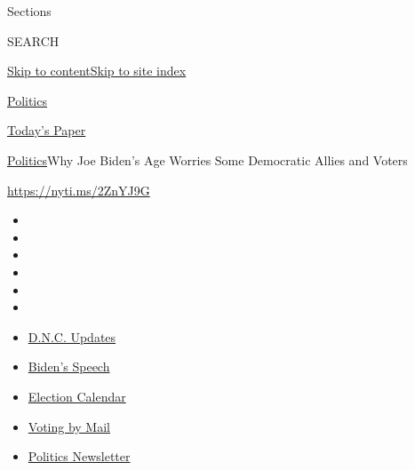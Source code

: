 Sections

SEARCH

\protect\hyperlink{site-content}{Skip to
content}\protect\hyperlink{site-index}{Skip to site index}

\href{https://www.nytimes3xbfgragh.onion/section/politics}{Politics}

\href{https://myaccount.nytimes3xbfgragh.onion/auth/login?response_type=cookie\&client_id=vi}{}

\href{https://www.nytimes3xbfgragh.onion/section/todayspaper}{Today's
Paper}

\href{/section/politics}{Politics}\textbar{}Why Joe Biden's Age Worries
Some Democratic Allies and Voters

\url{https://nyti.ms/2ZnYJ9G}

\begin{itemize}
\item
\item
\item
\item
\item
\item
\end{itemize}

\begin{itemize}
\item
  \href{https://www.nytimes3xbfgragh.onion/live/2020/08/20/us/dnc-convention-election?action=click\&pgtype=Article\&state=default\&region=TOP_BANNER\&context=storylines_menu}{D.N.C.
  Updates}
\item
  \href{https://www.nytimes3xbfgragh.onion/2020/08/20/us/politics/biden-presidential-nomination-dnc.html?action=click\&pgtype=Article\&state=default\&region=TOP_BANNER\&context=storylines_menu}{Biden's
  Speech}
\item
  \href{https://www.nytimes3xbfgragh.onion/interactive/2019/us/elections/2020-presidential-election-calendar.html?action=click\&pgtype=Article\&state=default\&region=TOP_BANNER\&context=storylines_menu}{Election
  Calendar}
\item
  \href{https://www.nytimes3xbfgragh.onion/interactive/2020/08/11/us/politics/vote-by-mail-us-states.html?action=click\&pgtype=Article\&state=default\&region=TOP_BANNER\&context=storylines_menu}{Voting
  by Mail}
\item
  \href{https://www.nytimes3xbfgragh.onion/newsletters/politics?action=click\&pgtype=Article\&state=default\&region=TOP_BANNER\&context=storylines_menu}{Politics
  Newsletter}
\end{itemize}

